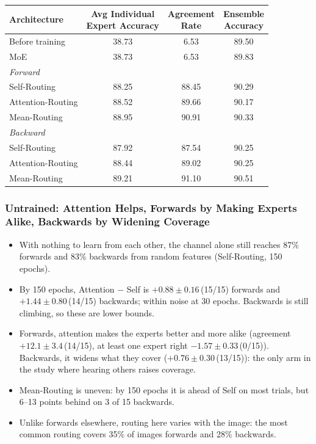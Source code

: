 \documentclass[11pt,a4paper]{article}
\newcommand{\tnote}[1]{\par\vspace{0.6ex}{\footnotesize #1}\par}
\newcommand{\pmse}[3]{$#1 \pm #2$\,(#3/15)}
\newcommand{\panel}[1]{\multicolumn{1}{l}{\textit{#1}}}
\newcommand{\finding}[2][12]{\Needspace{#1\baselineskip}\subsubsection*{#2}}
\begin{document}
\begin{center}
\small
\begin{tabular}{@{}lccc@{}}
\toprule
Architecture
& \shortstack{Avg Individual\\Expert Accuracy}
& \shortstack{Agreement\\Rate}
& \shortstack{Ensemble\\Accuracy} \\
\midrule
Before training & 38.73 & \phantom{0}6.53 & 89.50 \\
MoE             & 38.73 & \phantom{0}6.53 & 89.83 \\
\midrule
\panel{Forward} \\
\quad Self-Routing      & 88.25 & 88.45 & 90.29 \\
\quad Attention-Routing & 88.52 & 89.66 & 90.17 \\
\quad Mean-Routing      & 88.95 & 90.91 & 90.33 \\
\midrule
\panel{Backward} \\
\quad Self-Routing      & 87.92 & 87.54 & 90.25 \\
\quad Attention-Routing & 88.44 & 89.02 & 90.25 \\
\quad Mean-Routing      & 89.21 & 91.10 & 90.51 \\
\bottomrule
\end{tabular}
\tnote{$\lambda = 4$, all values in \%. At least one expert right is left out: it can't be compared
across $\lambda$, since experts that spread their guesses cover more classes by chance.}
\end{center}

\finding[24]{Untrained: Attention Helps, Forwards by Making Experts Alike, Backwards by Widening
Coverage}

\begin{itemize}
  \item With nothing to learn from each other, the channel alone still reaches 87\% forwards and
        83\% backwards from random features (Self-Routing, 150 epochs).
  \item By 150 epochs, Attention $-$ Self is \pmse{+0.88}{0.16}{15} forwards and
        \pmse{+1.44}{0.80}{14} backwards; within noise at 30 epochs. Backwards is still climbing,
        so these are lower bounds.
  \item Forwards, attention makes the experts better and more alike (agreement
        \pmse{+12.1}{3.4}{14}, at least one expert right \pmse{-1.57}{0.33}{0}). Backwards, it
        widens what they cover (\pmse{+0.76}{0.30}{13}): the only arm in the study where hearing
        others raises coverage.
  \item Mean-Routing is uneven: by 150 epochs it is ahead of Self on most trials, but 6--13 points
        behind on 3 of 15 backwards.
  \item Unlike forwards elsewhere, routing here varies with the image: the most common routing
        covers 35\% of images forwards and 28\% backwards.
\end{itemize}
\end{document}
